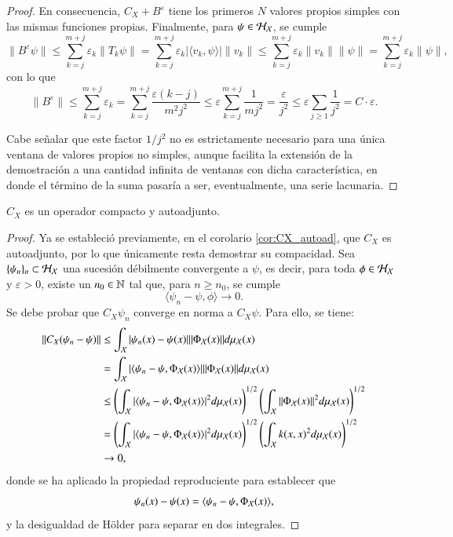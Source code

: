 \begin{proof}
    En consecuencia, $C_X + B^\varepsilon$ tiene los primeros $N$ valores propios simples con las mismas funciones propias. Finalmente, para $\psi \in \mathcal{H}_{\mathcal{X}}$, se cumple
    \[
    \| B^\varepsilon \psi \| \leq \sum_{k=j}^{m+j} \varepsilon_k \| T_k \psi \| = \sum_{k=j}^{m+j} \varepsilon_k | \langle v_k, \psi \rangle | \| v_k \| \leq \sum_{k=j}^{m+j} \varepsilon_k \| v_k \| \| \psi \| = \sum_{k=j}^{m+j} \varepsilon_k \| \psi \|,
    \]
    con lo que
    \[
    \| B^\varepsilon \| \leq \sum_{k=j}^{m+j} \varepsilon_k  = \sum_{k=j}^{m+j} \frac{\varepsilon (k-j)}{m^2 j^2} \leq \varepsilon \sum_{k=j}^{m+j} \frac{1}{m j^2} = \frac{\varepsilon}{j^2} \leq \varepsilon \sum_{j \geq 1} \frac{1}{j^2} = C \cdot \varepsilon.
    \]

    Cabe señalar que este factor $1/j^2$ no es estrictamente necesario para una única ventana de valores propios no simples, aunque facilita la extensión de la demostración a una cantidad infinita de ventanas con dicha característica, en donde el término de la suma pasaría a ser, eventualmente, una serie lacunaria.
\end{proof}

\begin{lema}
    $C_X$ es un operador compacto y autoadjunto.
\end{lema}

\begin{proof}
    Ya se estableció previamente, en el corolario \ref{cor:CX_autoad}, que $C_X$ es autoadjunto, por lo que únicamente resta demostrar su compacidad. Sea $\{ \psi_n \}_n \subset \mathcal{H}_{\mathcal{X}}$ una sucesión débilmente convergente a $\psi$, es decir, para toda $\phi \in \mathcal{H}_{\mathcal{X}}$ y $\varepsilon > 0$, existe un $n_0 \in \mathbb{N}$ tal que, para $n \geq n_0$, se cumple
    \[
    \langle \psi_n - \psi, \phi \rangle \to 0.
    \]
    Se debe probar que $C_X \psi_n$ converge en norma a $C_X \psi$. Para ello, se tiene:
    \[
    \begin{aligned}
        \| C_X (\psi_n - \psi) \| & \leq \int_{\mathcal{X}} | \psi_n (x) - \psi (x) | \| \Phi_{\mathcal{X}} (x) \| d \mu_{\mathcal{X}} (x) \\
        & = \int_{\mathcal{X}} | \langle \psi_n - \psi, \Phi_{\mathcal{X}} (x) \rangle | \| \Phi_{\mathcal{X}} (x) \| d \mu_{\mathcal{X}} (x) \\
        & \leq \left ( \int_{\mathcal{X}} | \langle \psi_n - \psi, \Phi_{\mathcal{X}} (x) \rangle |^2 d \mu_{\mathcal{X}} (x) \right )^{1/2} \left ( \int_{\mathcal{X}} \| \Phi_{\mathcal{X}} (x) \|^2 d \mu_{\mathcal{X}} (x) \right )^{1/2} \\
        & = \left ( \int_{\mathcal{X}} | \langle \psi_n - \psi, \Phi_{\mathcal{X}} (x) \rangle |^2 d \mu_{\mathcal{X}} (x) \right )^{1/2} \left ( \int_{\mathcal{X}} k(x,x)^2 d \mu_{\mathcal{X}} (x) \right )^{1/2} \\
        & \to 0,
    \end{aligned}
    \]
    donde se ha aplicado la propiedad reproduciente para establecer que
    \[
    \psi_n (x) - \psi (x) = \langle \psi_n - \psi, \Phi_{\mathcal{X}} (x) \rangle,
    \]
    y la desigualdad de Hölder para separar en dos integrales.
\end{proof}

